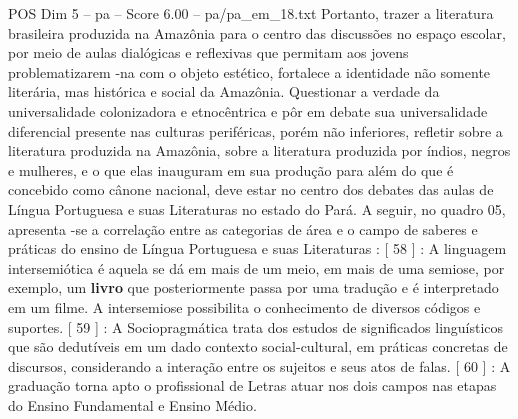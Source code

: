 \begin{textsample}{POS Dim 5 – pa – Score 6.00 – pa/pa\_em\_18.txt}
Portanto, trazer a literatura brasileira produzida na Amazônia para o centro das discussões no espaço escolar, por meio de aulas dialógicas e reflexivas que permitam aos jovens problematizarem -na com o objeto estético, fortalece a identidade não somente literária, mas histórica e social da Amazônia.
Questionar a verdade da universalidade colonizadora e etnocêntrica e pôr em debate sua universalidade diferencial presente nas culturas periféricas, porém não inferiores, refletir sobre a literatura produzida na Amazônia, sobre a literatura produzida por índios, negros e mulheres, e o que elas inauguram em sua produção para além do que é concebido como cânone nacional, deve estar no centro dos debates das aulas de Língua Portuguesa e suas Literaturas no estado do Pará.
A seguir, no quadro 05, apresenta -se a correlação entre as categorias de área e o campo de saberes e práticas do ensino de Língua Portuguesa e suas Literaturas : [ 58 ] : A linguagem intersemiótica é aquela se dá em mais de um meio, em mais de uma semiose, por exemplo, um \textbf{livro} que posteriormente passa por uma tradução e é interpretado em um filme.
A intersemiose possibilita o conhecimento de diversos códigos e suportes. [ 59 ] : A Sociopragmática trata dos estudos de significados linguísticos que são dedutíveis em um dado contexto social-cultural, em práticas concretas de discursos, considerando a interação entre os sujeitos e seus atos de falas. [ 60 ] : A graduação torna apto o profissional de Letras atuar nos dois campos nas etapas do Ensino Fundamental e Ensino Médio.

\end{textsample}
